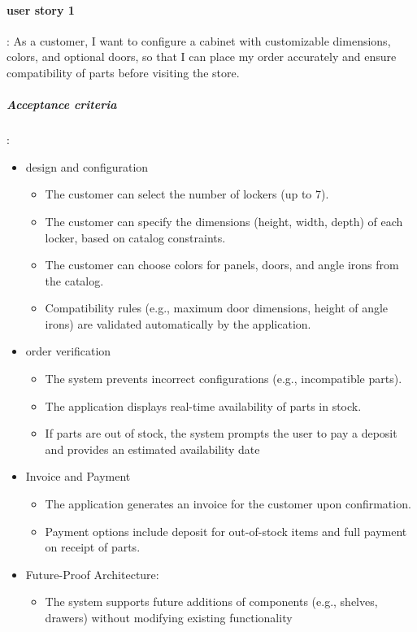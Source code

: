 \documentclass{article}
\begin{document}
\paragraph{user story 1}:
As a customer, I want to configure a cabinet with customizable dimensions, colors, and
optional doors, so that I can place my order accurately and ensure compatibility of parts
before visiting the store.
\subparagraph{Acceptance criteria}:
\begin{itemize}
    \item design and configuration
    \begin{itemize}
        \item The customer can select the number of lockers (up to 7).
        \item The customer can specify the dimensions (height, width, depth) of each locker, based on catalog constraints.
        \item The customer can choose colors for panels, doors, and angle irons from the catalog.
        \item Compatibility rules (e.g., maximum door dimensions, height of angle irons) are validated automatically by the application.
    \end{itemize}
    \item order verification
    \begin{itemize}
        \item The system prevents incorrect configurations 
        (e.g., incompatible parts).
        \item The application displays real-time availability of parts in stock.
        \item If parts are out of stock, the system prompts the user to pay a deposit and provides an estimated availability date
    \end{itemize}
    \item Invoice and Payment
    \begin{itemize}
        \item The application generates an invoice for the customer upon confirmation.
        \item Payment options include deposit for out-of-stock items and full payment on receipt of parts.
    \end{itemize}
    \item Future-Proof Architecture:
    \begin{itemize}
        \item The system supports future additions of components (e.g., shelves, drawers) without modifying existing functionality
    \end{itemize}
\end{itemize}
\end{document}
